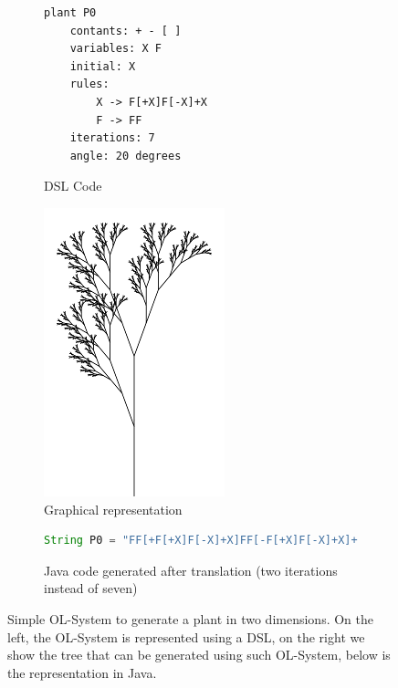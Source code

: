 \begin{figure}[ht]
\begin{mdframed}
\begin{subfigure}{0.45\textwidth}
\begin{lstlisting}[style={OL-systems}]
plant P0
	contants: + - [ ]
	variables: X F
	initial: X
	rules:
		X -> F[+X]F[-X]+X
		F -> FF
	iterations: 7
	angle: 20 degrees
\end{lstlisting}
\caption{DSL Code}\label{fig:l-system-code}
\end{subfigure}
\hspace{0.6cm}
\begin{subfigure}{0.45\textwidth}
\centering
\includegraphics[scale=0.35]{./chapter2/fig/plant.png}
\caption{Graphical representation}\label{fig:plant}
\end{subfigure}
\hspace{2.6cm}
\begin{subfigure} {\linewidth}\centering
\begin{lstlisting}[language=java, basicstyle=\footnotesize, stringstyle=\footnotesize\color{green!70!black}]
String P0 = "FF[+F[+X]F[-X]+X]FF[-F[+X]F[-X]+X]+F[+X]F[-X]+X";
\end{lstlisting}
\caption{Java code generated after translation (two iterations instead of seven)}\label{fig:l-system-generated}
\end{subfigure}
\end{mdframed}
\caption{Simple OL-System to generate a plant in two dimensions. On the left, the OL-System is represented using a DSL, on the right we show the tree that can be generated using such OL-System, below is the representation in Java.} \label{lst:OL-system-example}
\end{figure}

